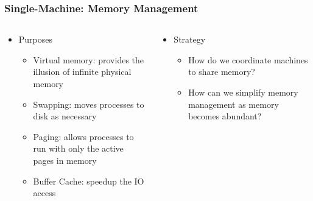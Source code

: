 \begin{frame}[plain,t]
	\frametitle{Single-Machine: Memory Management}
	\begin{columns}[t]
		\begin{column}{.5\textwidth}
			
			\begin{itemize}\Large
				\item Purposes
				\begin{itemize}\large
					\item Virtual memory: provides the
					illusion of infinite physical
					memory
					\item Swapping: moves processes to
					disk as necessary
					\item Paging: allows processes to run
					with only the active pages in
					memory
					\item Buffer Cache: speedup the IO
					access
					
				\end{itemize}
			\end{itemize}
			
		\end{column}\pause
		
		\begin{column}{.5\textwidth}
			
			\begin{itemize}\Large
				\item Strategy
				\begin{itemize}\large
					\item How do we coordinate
					machines to share
					memory?
					\item How can we simplify
					memory management as
					memory becomes
					abundant?
					
				\end{itemize}
			\end{itemize}
			
		\end{column}
	\end{columns}
\end{frame}

